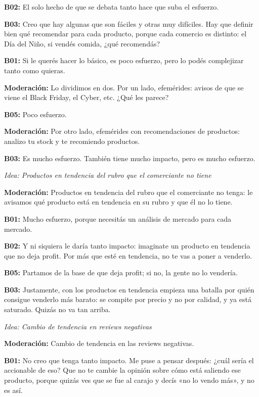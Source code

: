 \noindent\textbf{B02:} El solo hecho de que se debata tanto hace que suba el esfuerzo.

\noindent\textbf{B03:} Creo que hay algunas que son fáciles y otras muy difíciles. Hay que definir bien qué recomendar para cada producto, porque cada comercio es distinto: el Día del Niño, si vendés comida, ¿qué recomendás?

\noindent\textbf{B01:} Si le querés hacer lo básico, es poco esfuerzo, pero lo podés complejizar tanto como quieras.

\noindent\textbf{Moderación:} Lo dividimos en dos. Por un lado, efemérides: avisos de que se viene el Black Friday, el Cyber, etc. ¿Qué les parece?

\noindent\textbf{B05:} Poco esfuerzo.

\noindent\textbf{Moderación:} Por otro lado, efemérides con recomendaciones de productos: analizo tu stock y te recomiendo productos.

\noindent\textbf{B03:} Es mucho esfuerzo. También tiene mucho impacto, pero es mucho esfuerzo.

\medskip\noindent\textit{Idea: Productos en tendencia del rubro que el comerciante no tiene}

\noindent\textbf{Moderación:} Productos en tendencia del rubro que el comerciante no tenga: le avisamos qué producto está en tendencia en su rubro y que él no lo tiene.

\noindent\textbf{B01:} Mucho esfuerzo, porque necesitás un análisis de mercado para cada mercado.

\noindent\textbf{B02:} Y ni siquiera le daría tanto impacto: imaginate un producto en tendencia que no deja profit. Por más que esté en tendencia, no te vas a poner a venderlo.

\noindent\textbf{B05:} Partamos de la base de que deja profit; si no, la gente no lo vendería.

\noindent\textbf{B03:} Justamente, con los productos en tendencia empieza una batalla por quién consigue venderlo más barato: se compite por precio y no por calidad, y ya está saturado. Quizás no va tan arriba.

\medskip\noindent\textit{Idea: Cambio de tendencia en reviews negativas}

\noindent\textbf{Moderación:} Cambio de tendencia en las reviews negativas.

\noindent\textbf{B01:} No creo que tenga tanto impacto. Me puse a pensar después: ¿cuál sería el accionable de eso? Que no te cambie la opinión sobre cómo está saliendo ese producto, porque quizás ves que se fue al carajo y decís «no lo vendo más», y no es así.


